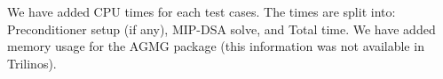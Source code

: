 \documentclass{article}
\begin{document}
We have added CPU times for each test cases. The times are split into: Preconditioner setup (if any), MIP-DSA solve, and Total time. 
We have added memory usage for the AGMG package (this information was not available in Trilinos).

\bigskip
\end{document}
